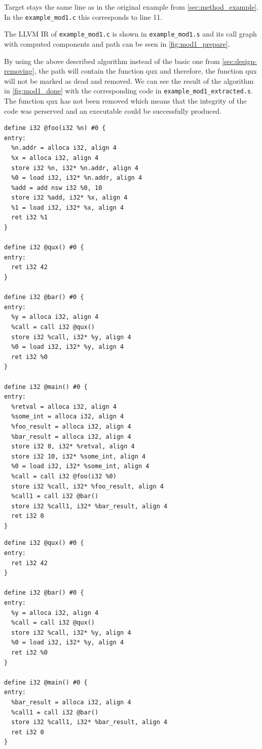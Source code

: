 \documentclass[12pt, twoside]{fithesis2}
\renewcommand{\_}{\leavevmode \kern0.07em\vbox{\hrule width0.4em}}
\begin{document}
Target stays the same line as in the original example from
\autoref{sec:method_example}.
In the \texttt{example_mod1.c} this corresponds to line 11.

The LLVM IR of \texttt{example_mod1.c} is shown in
\texttt{example_mod1.s} and its call graph with computed components
and path can be seen in \autoref{fig:mod1_prepare}.

By using the above described algorithm instead of the basic one from
\autoref{sec:design-removing}, the path will contain the function qux and
therefore, the function qux will not be marked as dead and removed.
We can see the result of the algorithm in \autoref{fig:mod1_done} with the
corresponding code in \texttt{example_mod1_extracted.s}.
The function qux has not been removed which means that the integrity of the code
was perserved and an executable could be successfully produced.

\begin{verbatim}
define i32 @foo(i32 %n) #0 {
entry:
  %n.addr = alloca i32, align 4
  %x = alloca i32, align 4
  store i32 %n, i32* %n.addr, align 4
  %0 = load i32, i32* %n.addr, align 4
  %add = add nsw i32 %0, 10
  store i32 %add, i32* %x, align 4
  %1 = load i32, i32* %x, align 4
  ret i32 %1
}

define i32 @qux() #0 {
entry:
  ret i32 42
}

define i32 @bar() #0 {
entry:
  %y = alloca i32, align 4
  %call = call i32 @qux()
  store i32 %call, i32* %y, align 4
  %0 = load i32, i32* %y, align 4
  ret i32 %0
}

define i32 @main() #0 {
entry:
  %retval = alloca i32, align 4
  %some_int = alloca i32, align 4
  %foo_result = alloca i32, align 4
  %bar_result = alloca i32, align 4
  store i32 0, i32* %retval, align 4
  store i32 10, i32* %some_int, align 4
  %0 = load i32, i32* %some_int, align 4
  %call = call i32 @foo(i32 %0)
  store i32 %call, i32* %foo_result, align 4
  %call1 = call i32 @bar()
  store i32 %call1, i32* %bar_result, align 4
  ret i32 0
}
\end{verbatim}

\begin{verbatim}
define i32 @qux() #0 {
entry:
  ret i32 42
}

define i32 @bar() #0 {
entry:
  %y = alloca i32, align 4
  %call = call i32 @qux()
  store i32 %call, i32* %y, align 4
  %0 = load i32, i32* %y, align 4
  ret i32 %0
}

define i32 @main() #0 {
entry:
  %bar_result = alloca i32, align 4
  %call1 = call i32 @bar()
  store i32 %call1, i32* %bar_result, align 4
  ret i32 0
}
\end{verbatim}
\end{document}
